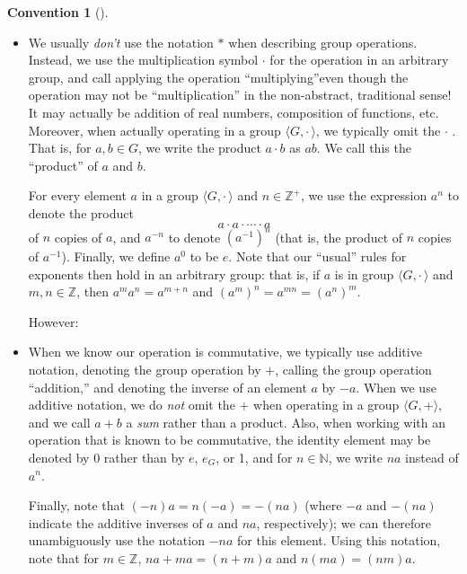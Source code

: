 \documentclass[10pt,]{book}
\theoremstyle{plain}
\theoremstyle{definition}
\theoremstyle{definition}
\newtheorem{convention}[theorem]{Convention}
\theoremstyle{definition}
\theoremstyle{definition}
\numberwithin{equation}{section}
\def\Z{\mathbb{Z}}
\def\N{\mathbb{N}}
\def\Gdot{\langle G, \cdot\,\rangle}
\begin{document}
\begin{convention}[]\label{convention-1}
\leavevmode%
\begin{itemize}[label=\textbullet]
\item{}We usually \emph{don't} use the notation \(*\) when describing group operations. Instead, we use the multiplication symbol \(\cdot\) for the operation in an arbitrary group, and  call applying the operation ``multiplying''\textemdash{}even though the operation may not be ``multiplication'' in the non-abstract, traditional sense! It may actually be addition of real numbers, composition of functions, etc. Moreover, when actually operating in a group \(\langle G, \cdot\,\rangle\), we typically omit the \(\cdot\) . That is, for \(a,b\in G\), we write the product \(a\cdot b\) as \(ab\). We call this the ``product'' of \(a\) and \(b\).%
\par
For every element \(a\) in a group \(\Gdot\) and \(n\in \Z^+\), we use the expression \(a^n\) to denote  the product%
\begin{equation*}
a \cdot a \cdot \cdots \cdot a
\end{equation*}
of \(n\) copies of \(a\), and \(a^{-n}\) to denote \((a^{-1})^n\) (that is, the product of \(n\) copies of \(a^{-1}\)). Finally, we define \(a^0\) to be \(e\).  Note that our ``usual'' rules for exponents then hold in an arbitrary group: that is, if \(a\) is in group \(\langle G, \cdot\,\rangle\) and \(m,n\in \Z\), then \(a^m a^n = a^{m+n}\) and \((a^m)^n=a^{mn}=(a^n)^m\).%
\par
However:%
\item{}\label{notation-37}
 When we know our operation is commutative, we typically use additive notation, denoting the group operation by \(+\), calling the group operation ``addition,'' and denoting the inverse of an element \(a\) by \(-a\). When we use additive notation, we do \emph{not} omit the \(+\) when operating in a group \(\langle G,+\rangle\), and we call \(a+b\) a \emph{sum} rather than a product. Also, when working with an operation that is known to be commutative,  the identity element may be denoted by 0 rather than by \(e\), \(e_G\), or 1, and for \(n\in \N\), we write \(na\) instead of \(a^n\).%
\par
Finally, note that \((-n)a=n(-a)=-(na)\) (where \(-a\) and \(-(na)\) indicate the additive inverses of \(a\) and \(na\), respectively); we can therefore unambiguously use the notation \(-na\) for this element. Using this notation, note that for \(m\in \Z\), \(na+ma=(n+m)a\) and \(n(ma)=(nm)a\).%
\end{itemize}
%
\end{convention}
\end{document}
